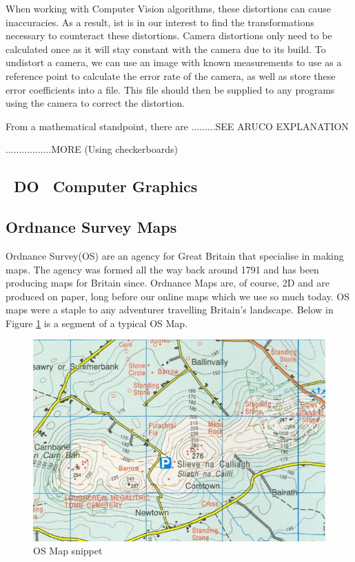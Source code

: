\documentclass[11pt]{article}
\begin{document}
When working with Computer Vision algorithms, these distortions can cause
inaccuracies. As a result, ist is in our interest to find the transformations
necessary to counteract these distortions. Camera distortions only need to be 
calculated once as it will stay constant with the camera due to its build.
To undistort a camera, we can use an image with known measurements to use
as a reference point to calculate the error rate of the camera, as well as
store these error coefficients into a file. This file should then be supplied
to any programs using the camera to correct the distortion.

From a mathematical standpoint, there are .........SEE ARUCO EXPLANATION

.................MORE (Using checkerboards)

\subsection{~DO~ Computer Graphics}


\subsection{Ordnance Survey Maps}
Ordnance Survey(OS) are an agency for Great Britain that specialise in
making maps. The agency was formed all the way back around 1791 and has
been producing maps for Britain since. Ordnance Maps are, of course, 2D and
are produced on paper, long before our online maps which we use so much 
today. OS maps were a staple to any adventurer travelling Britain's
landscape. Below in Figure \ref{OSmap} is a segment of a typical OS Map.
\begin{figure}
	\centering
	\includegraphics[scale=0.7]{pics/OSmap.png}
	\caption{OS Map snippet}
	\label{OSmap}
\end{figure}
\end{document}
